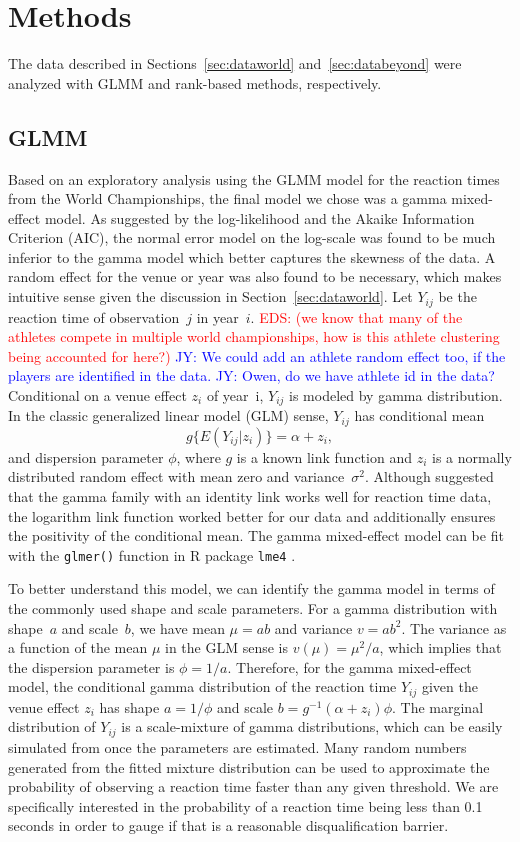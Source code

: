 \documentclass[12pt, letterpaper, titlepage]{article}
\newcommand{\jy}[1]{\textcolor{blue}{JY: #1}}
\newcommand{\eds}[1]{\textcolor{red}{EDS: (#1)}}
\begin{document}
\section{Methods} \label{sec:Methods}

The data described in Sections~\ref{sec:dataworld} and~\ref{sec:databeyond} were
analyzed with GLMM and rank-based methods, respectively.


\subsection{GLMM}\label{sec:glmm}
Based on an exploratory analysis using the GLMM model for the reaction times
from the World Championships, the final model we chose was a gamma mixed-effect 
model. As suggested by the log-likelihood and the Akaike Information
Criterion (AIC), the normal error model on the log-scale was found to be
much inferior to the gamma model which better captures the skewness of the
data. A random effect for the venue or year was also found to be necessary, 
which makes intuitive sense given the discussion in Section~\ref{sec:dataworld}. 
Let $Y_{ij}$ be the reaction time of observation~$j$ in year~$i$.
\eds{we know that many of the athletes compete in multiple world championships,
  how is this athlete clustering being accounted for here?}
\jy{We could add an athlete random effect too, if the players are identified in
  the data.}
\jy{Owen, do we have athlete id in the data?}
Conditional on a venue effect $z_i$ of year~i,  $Y_{ij}$ is modeled by 
gamma distribution. In the classic generalized linear model (GLM) sense,
$Y_{ij}$ has conditional mean
\[
g\{E(Y_{ij} | z_i)\} = \alpha + z_i,
\]
and dispersion parameter $\phi$, where $g$ is a known link function and
$z_i$ is a normally distributed random effect with mean zero and
variance~$\sigma^2$. Although \citet{lo2015idlink} suggested that the gamma 
family with an identity link works well for reaction time data, the logarithm 
link function worked better for our data and additionally ensures the positivity
of the conditional mean. The gamma mixed-effect model can be fit with the 
\texttt{glmer()} function in R package \texttt{lme4} \citep{lme4}.


To better understand this model, we can identify the gamma model in terms of the
commonly used shape and scale parameters. For a gamma distribution with
shape~$a$ and scale~$b$, we have mean $\mu = ab$ and variance $v = ab^2$. The
variance as a function of the mean $\mu$ in the GLM sense is
$v(\mu) = \mu^2 / a$, which implies that the dispersion parameter is
$\phi = 1 / a$. Therefore, for the gamma mixed-effect model, the conditional
gamma distribution of the reaction time $Y_{ij}$ given the venue effect $z_i$
has shape $a = 1 / \phi$ and scale $b = g^{-1}(\alpha + z_i) \phi$. The marginal
distribution of $Y_{ij}$ is a scale-mixture of gamma distributions, which can be
easily simulated from once the parameters are estimated. Many
random numbers generated from the fitted mixture distribution can be used to
approximate the probability of observing a reaction time faster than any given
threshold.  We are specifically interested in the probability of a reaction time
 being less than 0.1 seconds in order to gauge if that is a reasonable 
disqualification barrier.
\end{document}
